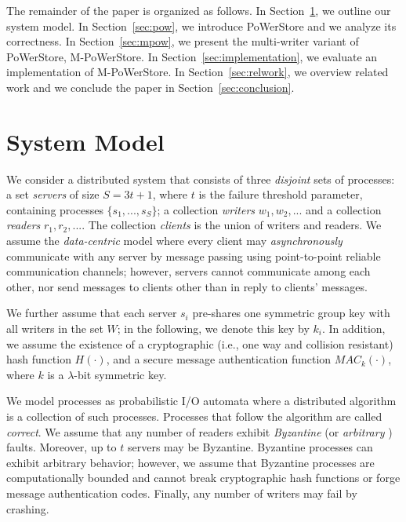 \documentclass[10pt,conference,compsocconf]{IEEEtran}
\newcommand{\protocol}{PoWerStore}
\newcommand{\mprotocol}{M-PoWerStore}
\begin{document}
The remainder of the paper is organized as follows. In Section~\ref{sec:model}, we outline our system model. In Section~\ref{sec:pow}, we introduce \protocol{} and we analyze its correctness.
In Section~\ref{sec:mpow}, we present the multi-writer variant of \protocol, \mprotocol{}. In Section~\ref{sec:implementation}, we evaluate an implementation of \mprotocol{}. In Section~\ref{sec:relwork}, we overview related work and we conclude the paper in Section~\ref{sec:conclusion}.


\section{System Model}
\label{sec:model}

We consider a distributed system that consists of three \emph{disjoint}
sets of processes: a set \emph{servers} of size $S=3t+1$, where $t$ is the failure threshold parameter, containing
processes $\{s_1, ..., s_S\}$; a collection \emph{writers} $w_1, w_2, ...$
and a collection \emph{readers} $r_1, r_2, ...$.
The collection \emph{clients} is the union of writers and readers.
We assume the \emph{data-centric} model \cite{CMD03,ChocklerGKV09,SMMK10} where every client may \emph{asynchronously} communicate with any server by message passing using point-to-point reliable
communication channels; however, servers cannot communicate
among each other, nor send messages to clients other
than in reply to clients' messages.

We further assume that each server $s_i$ pre-shares one symmetric group key with all writers
in the set $W$; in the following, we denote this key by $k_i$. In addition, we assume the existence of a cryptographic (i.e., one way and collision resistant) hash function $H(\cdot)$, and a secure message authentication function $MAC_k(\cdot)$, where $k$ is a $\lambda$-bit symmetric key.


We model processes as probabilistic I/O automata \cite{WSS94} where a distributed algorithm is a collection of such processes. Processes that follow the algorithm are called \emph{correct}. We assume that any number of readers exhibit \emph{Byzantine} \cite{LSP82} (or \emph{arbitrary} \cite{JCT98}) faults. Moreover, up to $t$ servers may be Byzantine. Byzantine processes can exhibit arbitrary behavior; however, we assume that Byzantine processes are computationally bounded and cannot break cryptographic hash functions or forge message authentication codes. Finally, any number of writers may fail by crashing.
\end{document}
